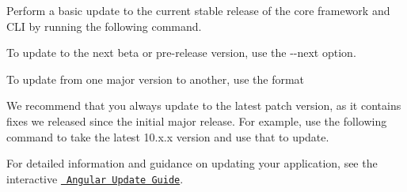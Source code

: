 Perform a basic update to the current stable release of the core framework and CLI by running the following command.


\begin{DoxyCode}{0}

\end{DoxyCode}


To update to the next beta or pre-\/release version, use the {\ttfamily -\/-\/next} option.

To update from one major version to another, use the format


\begin{DoxyCode}{0}

\end{DoxyCode}


We recommend that you always update to the latest patch version, as it contains fixes we released since the initial major release. For example, use the following command to take the latest 10.\+x.\+x version and use that to update.


\begin{DoxyCode}{0}

\end{DoxyCode}


For detailed information and guidance on updating your application, see the interactive \href{https://update.angular.io/}{\texttt{ Angular Update Guide}}. 